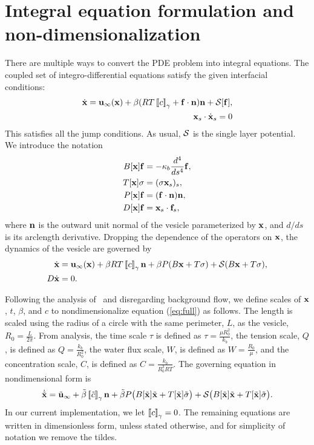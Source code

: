 \documentclass[twoside,twocolumn,9pt]{article}
\begin{document}
\section{Integral equation formulation and non-dimensionalization}
There are multiple ways to convert the PDE problem into integral
equations. The coupled set of
integro-differential equations satisfy the given interfacial conditions:
\begin{align}
  \label{eqn:vesVelocity}
  \dot{\mathbf{x}} = \mathbf{u}_\infty(\mathbf{x}) + \beta
  (RT\left[\!\left[ c \right]\!\right]_\gamma+\mathbf{f}\cdot\mathbf{n})\mathbf{n}
  + \mathcal{S} [\mathbf{f}], & \\
  \mathbf{x}_s\cdot\dot{\mathbf{x}}_s = 0 &
\end{align}
This satisfies all the jump conditions. As usual, $\mathcal{S}$ is the single
layer potential.  We introduce the notation
\begin{align}
  B[\mathbf{x}]\mathbf{f} &= -\kappa_b\frac{d^4}{ds^4} \mathbf{f}, \\
  T[\mathbf{x}]\sigma &= (\sigma \mathbf{x}_s)_s, \\
  P[\mathbf{x}]\mathbf{f} &= (\mathbf{f} \cdot \mathbf{n}) \mathbf{n}, \\
  D[\mathbf{x}]\mathbf{f} &= \mathbf{x}_s \cdot \mathbf{f}_s,
\end{align}
where $\mathbf{n}$ is the outward unit normal of the vesicle parameterized by
$\mathbf{x}$, and $d/ds$ is its arclength derivative.  Dropping the dependence
of the operators on $\mathbf{x}$, the dynamics of the vesicle are governed by
\begin{align}
  \dot{\mathbf{x}} &= \mathbf{u}_{\infty}(\mathbf{x}) + 
  \beta RT\left[\!\left[ c \right]\!\right]_\gamma\mathbf{n} + \beta P(B\mathbf{x} + T\sigma) + \mathcal{S}(B\mathbf{x} + T\sigma), \label{eq:full}\\
  D \dot{\mathbf{x}} &= 0.
\end{align}

Following the analysis of~\cite{vee-gue-zor-bir2009} and
disregarding background flow, we define scales of $\mathbf{x}$, $t$, $\beta$,
and $c$ to nondimensionalize equation (\ref{eq:full}) as follows. The
length is scaled using the radius of a circle with the same perimeter,
$L$, as the vesicle, $R_0 = \frac{L}{2\pi}$. From analysis, the time
scale $\tau$ is defined as $\tau = \frac{\mu R_0^2}{k_b}$, the tension
scale, $Q$, is defined as $Q = \frac{k_b}{R_0^2}$, the water flux scale,
$W$, is defined as $W=\frac{R_0}{\mu}$, and the concentration scale,
$C$, is defined as $C=\frac{k_b}{R_0^3RT}$. The governing equation in
nondimensional form is
\begin{align}
    \dot{\Tilde{\mathbf{x}}} = \Tilde{\mathbf{u}}_{\infty} + \Tilde{\beta}\left[\!\left[ \tilde{c} \right]\!\right]_\gamma\mathbf{n} +
    \Tilde{\beta}P\big(B[\Tilde{\mathbf{x}}]\Tilde{\mathbf{x}}+T[\Tilde{\mathbf{x}}]\Tilde{\sigma}\big)
    +\mathcal{S}\big( B[\Tilde{\mathbf{x}}]\Tilde{\mathbf{x}} + T[\Tilde{\mathbf{x}}]\Tilde{\sigma}\big).
\end{align}
In our current implementation, we let $\left[\!\left[ c \right]\!\right]_\gamma = 0$. The remaining equations are written in dimensionless form, unless stated otherwise, and for simplicity of notation we remove the tildes.
\end{document}
